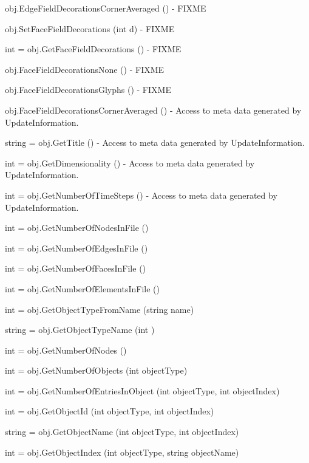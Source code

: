 \begin{DoxyItemize}
\item {\ttfamily obj.\-Edge\-Field\-Decorations\-Corner\-Averaged ()} -\/ F\-I\-X\-M\-E  
\item {\ttfamily obj.\-Set\-Face\-Field\-Decorations (int d)} -\/ F\-I\-X\-M\-E  
\item {\ttfamily int = obj.\-Get\-Face\-Field\-Decorations ()} -\/ F\-I\-X\-M\-E  
\item {\ttfamily obj.\-Face\-Field\-Decorations\-None ()} -\/ F\-I\-X\-M\-E  
\item {\ttfamily obj.\-Face\-Field\-Decorations\-Glyphs ()} -\/ F\-I\-X\-M\-E  
\item {\ttfamily obj.\-Face\-Field\-Decorations\-Corner\-Averaged ()} -\/ Access to meta data generated by Update\-Information.  
\item {\ttfamily string = obj.\-Get\-Title ()} -\/ Access to meta data generated by Update\-Information.  
\item {\ttfamily int = obj.\-Get\-Dimensionality ()} -\/ Access to meta data generated by Update\-Information.  
\item {\ttfamily int = obj.\-Get\-Number\-Of\-Time\-Steps ()} -\/ Access to meta data generated by Update\-Information.  
\item {\ttfamily int = obj.\-Get\-Number\-Of\-Nodes\-In\-File ()}  
\item {\ttfamily int = obj.\-Get\-Number\-Of\-Edges\-In\-File ()}  
\item {\ttfamily int = obj.\-Get\-Number\-Of\-Faces\-In\-File ()}  
\item {\ttfamily int = obj.\-Get\-Number\-Of\-Elements\-In\-File ()}  
\item {\ttfamily int = obj.\-Get\-Object\-Type\-From\-Name (string name)}  
\item {\ttfamily string = obj.\-Get\-Object\-Type\-Name (int )}  
\item {\ttfamily int = obj.\-Get\-Number\-Of\-Nodes ()}  
\item {\ttfamily int = obj.\-Get\-Number\-Of\-Objects (int object\-Type)}  
\item {\ttfamily int = obj.\-Get\-Number\-Of\-Entries\-In\-Object (int object\-Type, int object\-Index)}  
\item {\ttfamily int = obj.\-Get\-Object\-Id (int object\-Type, int object\-Index)}  
\item {\ttfamily string = obj.\-Get\-Object\-Name (int object\-Type, int object\-Index)}  
\item {\ttfamily int = obj.\-Get\-Object\-Index (int object\-Type, string object\-Name)}  

\end{DoxyItemize}
